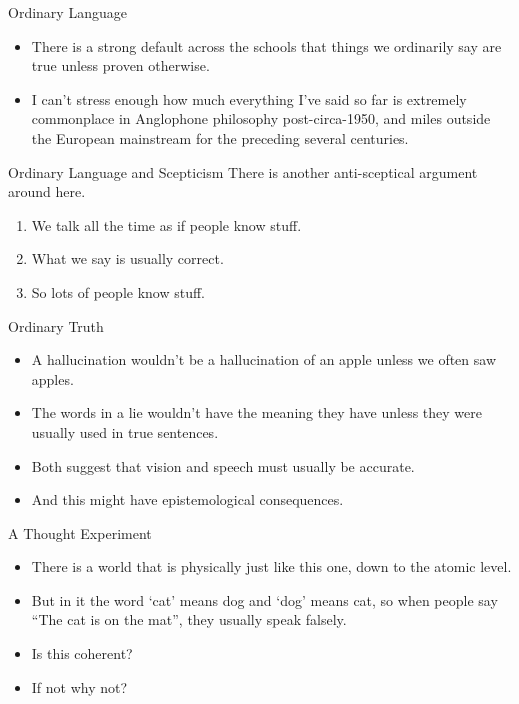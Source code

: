 \documentclass[
  17pt,
  letterpaper,
  ignorenonframetext,
  aspectratio=169,
]{beamer}
\providecommand{\tightlist}{%
  \setlength{\itemsep}{0pt}\setlength{\parskip}{0pt}}\usepackage{longtable,booktabs,array}
\begin{document}
\begin{frame}{Ordinary Language}
\protect\hypertarget{ordinary-language}{}
\begin{itemize}[<+->]
\tightlist
\item
  There is a strong default across the schools that things we ordinarily
  say are true unless proven otherwise.
\item
  I can't stress enough how much everything I've said so far is
  extremely commonplace in Anglophone philosophy post-circa-1950, and
  miles outside the European mainstream for the preceding several
  centuries.
\end{itemize}
\end{frame}

\begin{frame}{Ordinary Language and Scepticism}
\protect\hypertarget{ordinary-language-and-scepticism}{}
There is another anti-sceptical argument around here.

\begin{enumerate}[<+->]
\tightlist
\item
  We talk all the time as if people know stuff.
\item
  What we say is usually correct.
\item
  So lots of people know stuff.
\end{enumerate}
\end{frame}

\begin{frame}{Ordinary Truth}
\protect\hypertarget{ordinary-truth}{}
\begin{itemize}[<+->]
\tightlist
\item
  A hallucination wouldn't be a hallucination of an apple unless we
  often saw apples.
\item
  The words in a lie wouldn't have the meaning they have unless they
  were usually used in true sentences.
\item
  Both suggest that vision and speech must usually be accurate.
\item
  And this might have epistemological consequences.
\end{itemize}
\end{frame}

\begin{frame}{A Thought Experiment}
\protect\hypertarget{a-thought-experiment}{}
\begin{itemize}[<+->]
\tightlist
\item
  There is a world that is physically just like this one, down to the
  atomic level.
\item
  But in it the word `cat' means dog and `dog' means cat, so when people
  say ``The cat is on the mat'', they usually speak falsely.
\item
  Is this coherent?
\item
  If not why not?
\end{itemize}
\end{frame}
\end{document}
